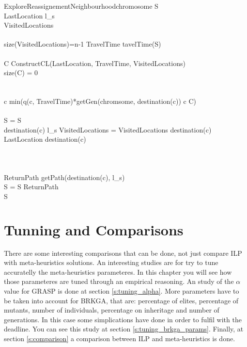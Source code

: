 \documentclass[]{report}
\begin{document}
\begin{pseudocode}{ExploreReassignementNeighbourhood}{chromosome}
	\label{pc:brkga_decoder}
	S \GETS \varnothing\\
	LastLocation \GETS l_{s}\\
	VisitedLocations \GETS \varnothing\\
	\\
	\WHILE \NOT size(VisitedLocations)=n-1 \DO
	\BEGIN
	TravelTime \GETS tavelTime(S)\\
	\\
	C \GETS ConstructCL(LastLocation, TravelTime, VisitedLocations)\\
	\IF size(C) = 0 \THEN
	\\
	\\
	\\
	c \GETS min(q(c, TravelTime)*getGen(chromsome, destination(c)) \quad \forall c \in C)\\
	\\
	S = S \\
	\IF destination(c) \neq l_{s} \THEN
	VisitedLocations = VisitedLocations \cup destination(c)\\
	LastLocation \GETS destination(c)\\
	\END\\
	\\
	\\
	ReturnPath \GETS getPath(destination(c), l_{s})\\
	S = S \cup ReturnPath\\
	
	\RETURN S
\end{pseudocode}

\chapter{Tunning and Comparisons}\label{ch:comparison}

There are some interesting comparisons that can be done, not just compare ILP with meta-heuristics solutions. An interesting studies are for try to tune accuratelly the meta-heuristics parameteres. In this chapter you will see how those parameteres are tuned through an empirical reasoning. An study of the $\alpha$ value for GRASP is done at section \ref{s:tuning_alpha}. More parameters have to be taken into account for BRKGA, that are: percentage of elites, percentage of mutants, number of individuals, percentage on inheritage and number of generations. In this case some simplications have done in order to fulfil with the deadline. You can see this study at section \ref{s:tuning_brkga_params}. Finally, at section \ref{s:comparison} a comparison between ILP and meta-heuristics is done.
\end{document}
